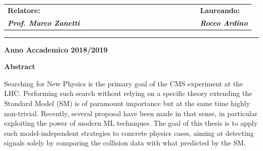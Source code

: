 \begin{titlepage}
\vspace{10mm}

\begin{spacing}{2}
\begin{tabular}{ l  c  c c c  cccccccc c c c  c  l }
{\Large{\bf Relatore:}} &&&&&&&&&&&&&&&&& {\Large{\bf Laureando:}}\\
{\Large{\bf \textit{Prof. Marco Zanetti}}} &&&&&&&&&&&&&&&&& {\Large{\bf \textit{Rocco Ardino}}}\\
\end{tabular}
\end{spacing}

\vspace{15 mm}
\vspace*{\fill}
\hrule
\begin{center}
{\Large{\bf Anno Accademico 2018/2019}}
\end{center}
\end{titlepage}



\vspace*{\fill}
\begingroup

\begin{center}
{{\large{\bf Abstract}}}
\end{center}

\begin{center}
Searching for New Physics is the primary goal of the CMS experiment at the LHC. Performing such search without relying on a
specific theory extending the Standard Model (SM) is of paramount importance but at the same time highly non-trivial. Recently,
several proposal have been made in that sense, in particular exploiting the power of modern ML techniques. The goal of this thesis is
to apply such model-independent strategies to concrete physics cases, aiming at detecting signals solely by comparing the collision
data with what predicted by the SM.
\end{center}


